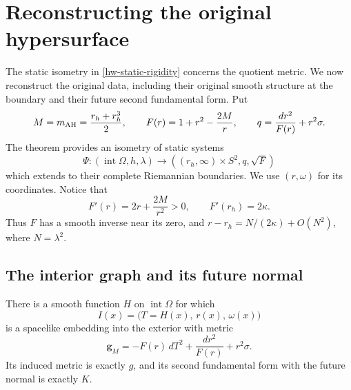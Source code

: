 \section{Reconstructing the original hypersurface}
\label{emb-section}

The static isometry in \cref{hw-static-rigidity} concerns the quotient
metric.  We now reconstruct the original data, including their original
smooth structure at the boundary and their future second fundamental
form.  Put
\begin{equation}
 M=m_{\mathrm{AH}}=\frac{r_h+r_h^3}{2},\qquad
 F(r)=1+r^2-\frac{2M}{r},\qquad
 q=\frac{dr^2}{F(r)}+r^2\sigma .
 \label{emb-model}
\end{equation}
The theorem provides an isometry of static systems
\[
 \Psi:(\operatorname{int}\Omega,h,\lambda)
       \longrightarrow ((r_h,\infty)\times S^2,q,\sqrt F)
\]
which extends to their complete Riemannian boundaries.  We use
$(r,\omega)$ for its coordinates.  Notice that
\[
 F'(r)=2r+\frac{2M}{r^2}>0,\qquad F'(r_h)=2\kappa .
\]
Thus $F$ has a smooth inverse near its zero, and
$r-r_h=N/(2\kappa)+O(N^2)$, where $N=\lambda^2$.

\subsection{The interior graph and its future normal}

\begin{lemma}
\label{emb-interior}
There is a smooth function $H$ on $\operatorname{int}\Omega$ for
which
\begin{equation}
 I(x)=\bigl(T=H(x),\,r(x),\,\omega(x)\bigr)
 \label{emb-graph}
\end{equation}
is a spacelike embedding into the exterior with metric
\[
 \mathbf g_M=-F(r)\,dT^2+\frac{dr^2}{F(r)}+r^2\sigma .
\]
Its induced metric is exactly $g$, and its second fundamental form
with the future normal is exactly $K$.
\end{lemma}

